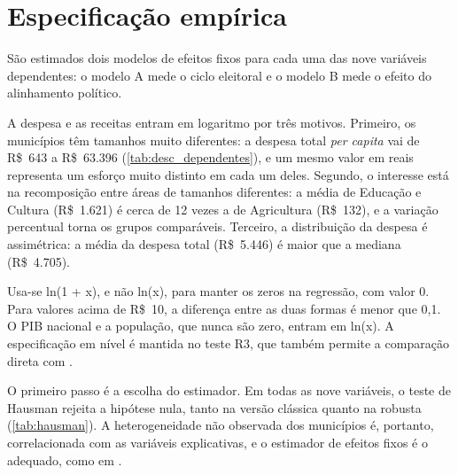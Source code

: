 \section{Especificação empírica}\label{sec:especificacao}

São estimados dois modelos de efeitos fixos para cada uma das nove variáveis dependentes: o modelo A mede o ciclo eleitoral e o modelo B mede o efeito do alinhamento político.

A despesa e as receitas entram em logaritmo por três motivos. Primeiro, os municípios têm tamanhos muito diferentes: a despesa total \textit{per capita} vai de R\$~643 a R\$~63.396 (\autoref{tab:desc_dependentes}), e um mesmo valor em reais representa um esforço muito distinto em cada um deles. Segundo, o interesse está na recomposição entre áreas de tamanhos diferentes: a média de Educação e Cultura (R\$~1.621) é cerca de 12 vezes a de Agricultura (R\$~132), e a variação percentual torna os grupos comparáveis. Terceiro, a distribuição da despesa é assimétrica: a média da despesa total (R\$~5.446) é maior que a mediana (R\$~4.705).

Usa-se ln(1 + x), e não ln(x), para manter os zeros na regressão, com valor 0. Para valores acima de R\$~10, a diferença entre as duas formas é menor que 0,1. O PIB nacional e a população, que nunca são zero, entram em ln(x). A especificação em nível é mantida no teste R3, que também permite a comparação direta com \textcite{sakurai2009}.

O primeiro passo é a escolha do estimador. Em todas as nove variáveis, o teste de Hausman rejeita a hipótese nula, tanto na versão clássica quanto na robusta (\autoref{tab:hausman}). A heterogeneidade não observada dos municípios é, portanto, correlacionada com as variáveis explicativas, e o estimador de efeitos fixos é o adequado, como em \textcite{sakurai2009}.

